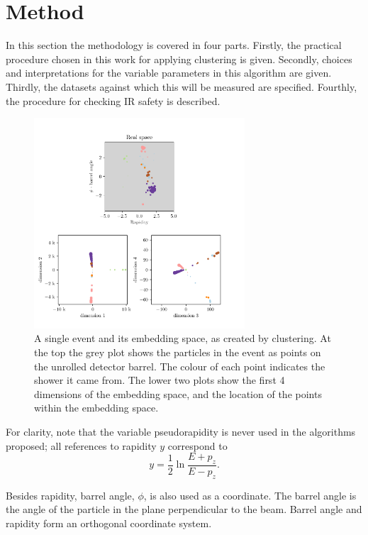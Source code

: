 \section{Method}
In this section the methodology is covered in four parts.
Firstly, the practical procedure chosen in this work for applying \spectral{} clustering  is given.
Secondly, choices and interpretations for the variable parameters in this algorithm are given.
Thirdly,  the datasets against which this will be measured are specified.
Fourthly, the procedure for checking IR safety is described.

    \begin{figure}[!t]
        \center
        \includegraphics[width=0.7\textwidth]{graphics/embedding_space_simple2.pdf}
        \caption{A single event and its embedding space, as created by \spectral{} clustering.
            At the top the grey plot shows the particles in the event as points on the unrolled detector barrel.
            The colour of each point indicates the shower it came from.
            The lower two plots show the first 4 dimensions of the embedding space,
            and the location of the points within the embedding space.}\label{fig:embedding_space_simple}
    \end{figure}    


For clarity, note that the variable pseudorapidity is never used
in the algorithms proposed; all references to rapidity $y$ correspond to
\begin{equation}\label{eqn:rapidity}
    y = \frac{1}{2} \ln\frac{E + p_z}{E - p_z}.
\end{equation}

Besides rapidity, barrel angle, \(\phi\), is also used as a coordinate.
The barrel angle is the angle of the particle in the plane perpendicular to the beam.
Barrel angle and rapidity form an orthogonal coordinate system.

